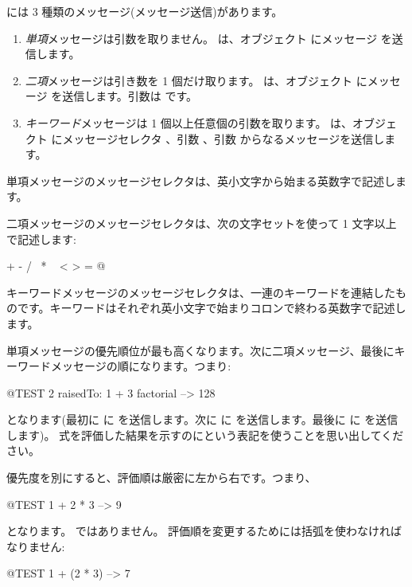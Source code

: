 \documentclass[a4paper,10pt,twoside]{book}
\begin{document}
\pharo には 3 種類のメッセージ(メッセージ送信)があります。
\begin{enumerate}
  \item \emph{単項}メッセージは引数を取りません。
  は、オブジェクト  にメッセージ  を送信します。
  \item \emph{二項}メッセージは引き数を 1 個だけ取ります。
  	 は、オブジェクト  にメッセージ \ct{+} を送信します。引数は  です。
  \item \emph{キーワード}メッセージは 1 個以上任意個の引数を取ります。
  	 は、オブジェクト  にメッセージセレクタ
	、引数 、引数  からなるメッセージを送信します。
\end{enumerate}

単項メッセージのメッセージセレクタは、英小文字から始まる英数字で記述します。

二項メッセージのメッセージセレクタは、次の文字セットを使って 1 文字以上で記述します:
\begin{code}{}
+ - / \ * ~ < > = @ %
\end{code}
\noindent
キーワードメッセージのメッセージセレクタは、一連のキーワードを連結したものです。キーワードはそれぞれ英小文字で始まりコロンで終わる英数字で記述します。

単項メッセージの優先順位が最も高くなります。次に二項メッセージ、最後にキーワードメッセージの順になります。つまり:
\begin{code}{@TEST}
2 raisedTo: 1 + 3 factorial --> 128
\end{code}
となります(最初に  に  を送信します。次に  に  を送信します。最後に  に  を送信します)。
式を評価した結果を示すのに\ct{-->}という表記を使うことを思い出してください。

優先度を別にすると、評価順は厳密に左から右です。つまり、
\begin{code}{@TEST}
1 + 2 * 3 --> 9
\end{code}
となります。 ではありません。
評価順を変更するためには括弧を使わなければなりません:
\begin{code}{@TEST}
1 + (2 * 3) --> 7
\end{code}
\end{document}
